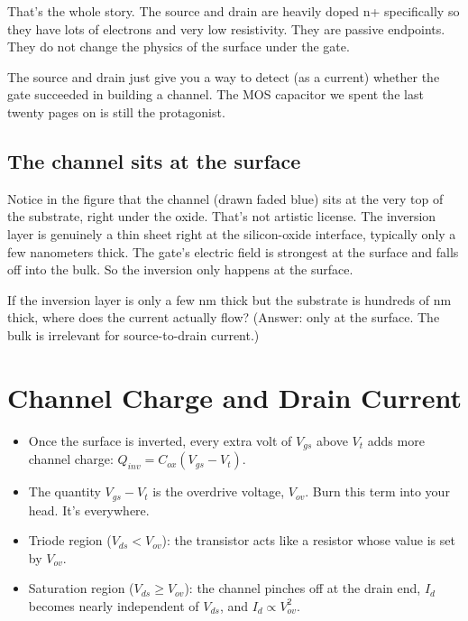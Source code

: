 \documentclass[11pt]{article}
\begin{document}
That's the whole story. The source and drain are heavily doped n+ specifically so they have lots of electrons and very low resistivity. They are passive endpoints. They do not change the physics of the surface under the gate.

\begin{keyidea}
The source and drain just give you a way to detect (as a current) whether the gate succeeded in building a channel. The MOS capacitor we spent the last twenty pages on is still the protagonist.
\end{keyidea}

\subsection{The channel sits at the surface}

Notice in the figure that the channel (drawn faded blue) sits at the very top of the substrate, right under the oxide. That's not artistic license. The inversion layer is genuinely a thin sheet right at the silicon-oxide interface, typically only a few nanometers thick. The gate's electric field is strongest at the surface and falls off into the bulk. So the inversion only happens at the surface.

\begin{gut}
If the inversion layer is only a few nm thick but the substrate is hundreds of nm thick, where does the current actually flow? (Answer: only at the surface. The bulk is irrelevant for source-to-drain current.)
\end{gut}

\section{Channel Charge and Drain Current}

\begin{tldr}
\begin{itemize}[leftmargin=*]
\item Once the surface is inverted, every extra volt of $V_{gs}$ above $V_t$ adds more channel charge: $Q_{inv} = C_{ox}(V_{gs} - V_t)$.
\item The quantity $V_{gs} - V_t$ is the overdrive voltage, $V_{ov}$. Burn this term into your head. It's everywhere.
\item Triode region ($V_{ds} < V_{ov}$): the transistor acts like a resistor whose value is set by $V_{ov}$.
\item Saturation region ($V_{ds} \ge V_{ov}$): the channel pinches off at the drain end, $I_d$ becomes nearly independent of $V_{ds}$, and $I_d \propto V_{ov}^2$.
\end{itemize}
\end{tldr}
\end{document}
